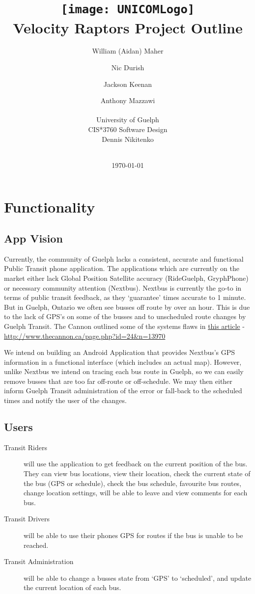 \documentclass[a4paper,12pt]{article}
\title{\texttt{[image: UNICOMLogo]}\\Velocity Raptors Project Outline}
\author{
William (Aidan) Maher
\and
Nic Durish
\and
Jackson Keenan
\and
Anthony Mazzawi
\\\\
University of Guelph\\
CIS*3760 Software Design\\
Dennis Nikitenko\\\\
}
\date{\today}
\begin{document}
\clearpage\maketitle
\thispagestyle{empty}
\pagebreak
{}
\tableofcontents
\pagebreak
{}

\section{Functionality}
\subsection{App Vision}


Currently, the community of Guelph lacks a consistent, accurate and functional Public Transit phone application. The applications which are currently on the market either lack Global Position Satellite accuracy (RideGuelph, GryphPhone) or necessary community attention (Nextbus). Nextbus is currently the go-to in terms of public transit feedback, as they ‘guarantee’ times accurate to 1 minute. But in Guelph, Ontario we often see busses off route by over an hour. This is due to the lack of GPS’s on some of the busses and to unscheduled route changes by Guelph Transit. The Cannon outlined some of the systems flaws in \href{http://www.thecannon.ca/page.php?id=24&n=13970}{this article} - \url{http://www.thecannon.ca/page.php?id=24&n=13970}

We intend on building an Android Application that provides Nextbus’s GPS information in a functional interface (which includes an actual map). However, unlike Nextbus we intend on tracing each bus route in Guelph, so we can easily remove busses that are too far off-route or off-schedule. We may then either inform Guelph Transit administration of the error or fall-back to the scheduled times and notify the user of the changes. 

\subsection{Users}
\begin{description}
\item [Transit Riders] will use the application to get feedback on the current position of the bus. They can view bus locations, view their location, check the current state of the bus (GPS or schedule), check the bus schedule, favourite bus routes, change location settings, will be able to leave and view comments for each bus. 

\item [Transit Drivers] will be able to use their phones GPS for routes if the bus is unable to be reached.

\item [Transit Administration] will be able to change a busses state from ‘GPS’ to ‘scheduled’, and update the current location of each bus. 

\end{description}
\end{document}
